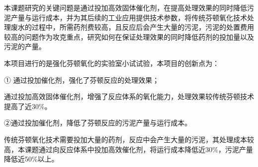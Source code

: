 本课题研究的关键问题是通过投加高效固体催化剂，在提高处理效果的同时降低污泥产量与运行成本，并为其后续的工业应用提供技术参数，将传统芬顿氧化技术处理废水的过程中，所需药剂费较高，且反应后会产生大量的污泥，污泥的处置费用较高的问题作为攻克重点，研究如何在保证处理效果的同时降低药剂的投加量以及污泥的产量。\par

本项目进行的是强化芬顿氧化的实验室小试试验，本项目的创新点为：\par
① 通过投加催化剂，强化了芬顿反应的处理效果；\par
通过投加高效固体催化剂，增强了反应体系的氧化能力，处理效果较传统芬顿技术提高了近30\%。\par
②通过投加催化剂，降低了芬顿反应的污泥产量与运行成本。\par
传统芬顿氧化技术需要投加大量的药剂，反应中会产生大量的污泥，其处理成本较高，本课题通过向反应体系中投加高效催化剂，将运行成本降低近30\%，污泥产量降低近50\%以上。\par
